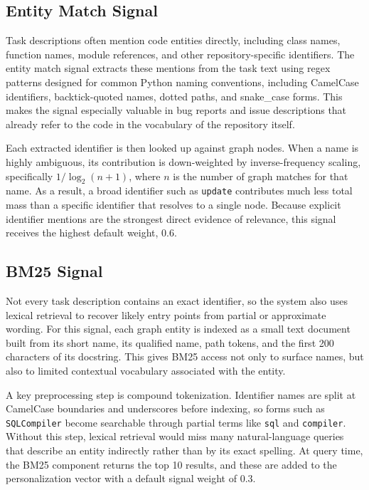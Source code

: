 \subsection{Entity Match Signal}
\label{sec:entity-match}

Task descriptions often mention code entities directly, including class names, function names, module references, and other repository-specific identifiers. The entity match signal extracts these mentions from the task text using regex patterns designed for common Python naming conventions, including CamelCase identifiers, backtick-quoted names, dotted paths, and snake\_case forms. This makes the signal especially valuable in bug reports and issue descriptions that already refer to the code in the vocabulary of the repository itself.

Each extracted identifier is then looked up against graph nodes. When a name is highly ambiguous, its contribution is down-weighted by inverse-frequency scaling, specifically $1 / \log_2(n + 1)$, where $n$ is the number of graph matches for that name. As a result, a broad identifier such as \texttt{update} contributes much less total mass than a specific identifier that resolves to a single node. Because explicit identifier mentions are the strongest direct evidence of relevance, this signal receives the highest default weight, 0.6.


\subsection{BM25 Signal}
\label{sec:bm25-signal}

Not every task description contains an exact identifier, so the system also uses lexical retrieval to recover likely entry points from partial or approximate wording. For this signal, each graph entity is indexed as a small text document built from its short name, its qualified name, path tokens, and the first 200 characters of its docstring. This gives BM25 access not only to surface names, but also to limited contextual vocabulary associated with the entity.

A key preprocessing step is compound tokenization. Identifier names are split at CamelCase boundaries and underscores before indexing, so forms such as \texttt{SQLCompiler} become searchable through partial terms like \texttt{sql} and \texttt{compiler}. Without this step, lexical retrieval would miss many natural-language queries that describe an entity indirectly rather than by its exact spelling. At query time, the BM25 component returns the top 10 results, and these are added to the personalization vector with a default signal weight of 0.3.


